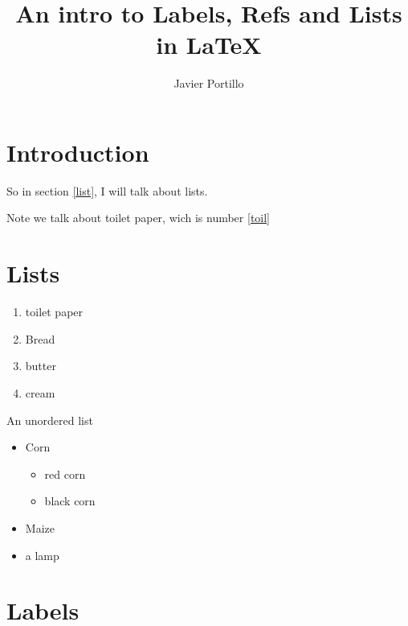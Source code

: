 \documentclass{article}
\author{Javier Portillo}
\title{An intro to Labels, Refs and Lists in {\LaTeX}}
\begin{document}
\maketitle

\section{Introduction}

So in section \ref{list}, I will talk about lists.

Note we talk about toilet paper, wich is number \ref{toil}

\section{Lists\label{list}}

\begin{enumerate}
  \item toilet paper\label{toil}
  \item Bread
  \item butter
  \item cream
\end{enumerate}

An unordered list

\begin{itemize}
  \item Corn
    \begin{itemize}
      \item red corn
      \item black corn
    \end{itemize}
  \item Maize
  \item a lamp
\end{itemize}

\section{Labels}
\end{document}
